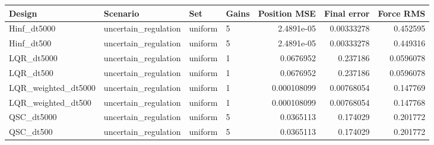 \begin{tabular}{llllrrr}
\hline
Design & Scenario & Set & Gains & Position MSE & Final error & Force RMS \\
\hline
Hinf\_dt5000 & uncertain\_regulation & uniform & 5 & 2.4891e-05 & 0.00333278 & 0.452595 \\
Hinf\_dt500 & uncertain\_regulation & uniform & 5 & 2.4891e-05 & 0.00333278 & 0.449316 \\
LQR\_dt5000 & uncertain\_regulation & uniform & 1 & 0.0676952 & 0.237186 & 0.0596078 \\
LQR\_dt500 & uncertain\_regulation & uniform & 1 & 0.0676952 & 0.237186 & 0.0596078 \\
LQR\_weighted\_dt5000 & uncertain\_regulation & uniform & 1 & 0.000108099 & 0.00768054 & 0.147769 \\
LQR\_weighted\_dt500 & uncertain\_regulation & uniform & 1 & 0.000108099 & 0.00768054 & 0.147768 \\
QSC\_dt5000 & uncertain\_regulation & uniform & 5 & 0.0365113 & 0.174029 & 0.201772 \\
QSC\_dt500 & uncertain\_regulation & uniform & 5 & 0.0365113 & 0.174029 & 0.201772 \\
\hline
\end{tabular}
